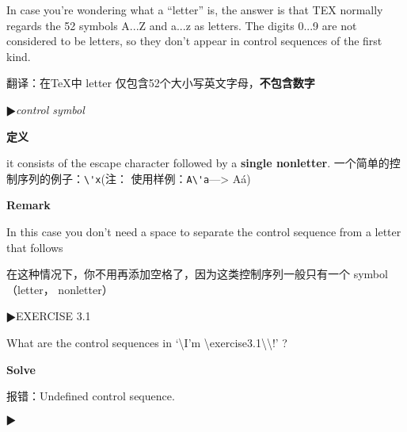 \documentclass[fontset=windows, 12pt]{article}
\newcommand{\trans}[1]{{\ttfamily #1}}
\newcommand{\num}{\ensuremath{\RHD}}
\begin{document}
In case you’re
wondering what a “letter” is, the answer is that TEX normally regards the 52
symbols A...Z and a...z as letters. The digits 0...9 are not considered to be
letters, so they don’t appear in control sequences of the first kind.

\trans{翻译：在\TeX 中 letter 仅包含52个大小写英文字母，}\textbf{不包含数字}

\num {\itshape control symbol}

\textbf{定义}

it consists of the escape character followed by a  {\bf single nonletter}. 
一个简单的控制序列的例子：\verb |\'x|(注： 使用样例：\verb|A\'a|---> A\'a)

\textbf{Remark}

In this case you
don’t need a space to separate the control sequence from a letter that follows

\trans{在这种情况下，你不用再添加空格了，因为这类控制序列一般只有一个 symbol（letter， nonletter）}


\num  EXERCISE 3.1

What are the control sequences in ‘\textbackslash I’m \textbackslash exercise3.1\textbackslash\textbackslash!’ ?

\textbf{Solve}

报错：Undefined control sequence.

\num 
\end{document}
